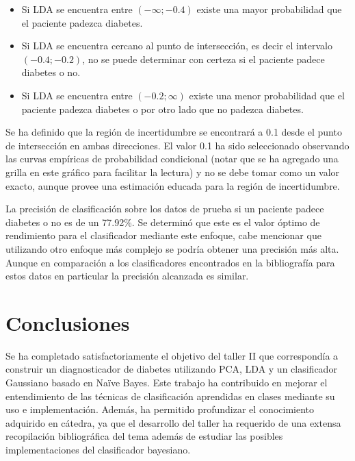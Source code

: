 \documentclass[letter, titlepage, 10pt]{article}
\begin{document}
\begin{itemize}
    \item Si LDA se encuentra entre $(-\infty;-0.4)$ existe una mayor probabilidad que el paciente padezca diabetes.
    \item Si LDA se encuentra cercano al punto de intersección, es decir el intervalo $(-0.4;-0.2)$, no se puede determinar con certeza si el paciente padece diabetes o no.
    \item Si LDA se encuentra entre $(-0.2; \infty)$ existe una menor probabilidad que el paciente padezca diabetes o por otro lado que no padezca diabetes.
\end{itemize}

Se ha definido que la región de incertidumbre se encontrará a 0.1  desde el punto de intersección en ambas direcciones. El valor 0.1 ha sido seleccionado observando las curvas empíricas de probabilidad condicional (notar que se ha agregado una grilla en este gráfico para facilitar la lectura) y no se debe tomar como un valor exacto, aunque provee una estimación educada para la región de incertidumbre.

La precisión de clasificación sobre los datos de prueba si un paciente padece diabetes o no es de un 77.92\%. Se determinó que este es el valor óptimo de rendimiento para el clasificador mediante este enfoque, cabe mencionar que utilizando otro enfoque más complejo se podría obtener una precisión más alta. Aunque en comparación a los clasificadores encontrados en la bibliografía para estos datos en particular la precisión alcanzada es similar.


\newpage

\newpage
\section{Conclusiones}
Se ha completado satisfactoriamente el objetivo del taller II que correspondía a construir un diagnosticador de diabetes utilizando PCA, LDA y un clasificador Gaussiano basado en Naïve Bayes. Este trabajo ha contribuido en mejorar el entendimiento de las técnicas de clasificación aprendidas en clases mediante su uso e implementación. Además, ha permitido profundizar el conocimiento adquirido en cátedra, ya que el desarrollo del taller ha requerido de una extensa recopilación bibliográfica del tema además de estudiar las posibles implementaciones del clasificador bayesiano.
\end{document}

